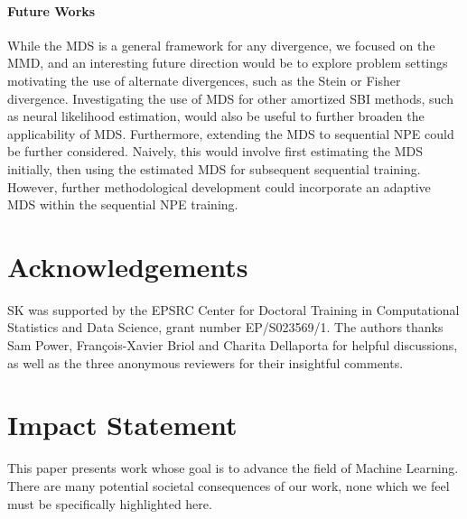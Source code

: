 \documentclass{article}
\theoremstyle{plain}
\theoremstyle{definition}
\theoremstyle{remark}
\begin{document}
\paragraph{Future Works} While the MDS is a general framework for any divergence, we focused on the MMD, and an interesting future direction would be to explore problem settings motivating the use of alternate divergences, such as the Stein or Fisher divergence. Investigating the use of MDS for other amortized SBI methods, such as neural likelihood estimation, would also be useful to further broaden the applicability of MDS. Furthermore, extending the MDS to sequential NPE could be further considered. Naively, this would involve first estimating the MDS initially, then using the estimated MDS for subsequent sequential training. However, further methodological development could incorporate an adaptive MDS within the sequential NPE training.

\section*{Acknowledgements}

SK was supported by the EPSRC Center for Doctoral Training in Computational Statistics and Data Science, grant number EP/S023569/1.
The authors thanks Sam Power, François-Xavier Briol and Charita Dellaporta for helpful discussions, as well as the three anonymous reviewers for their insightful comments. 

\section*{Impact Statement}


This paper presents work whose goal is to advance the field of Machine
Learning. There are many potential societal consequences of our work, none
which we feel must be specifically highlighted here.
\end{document}
